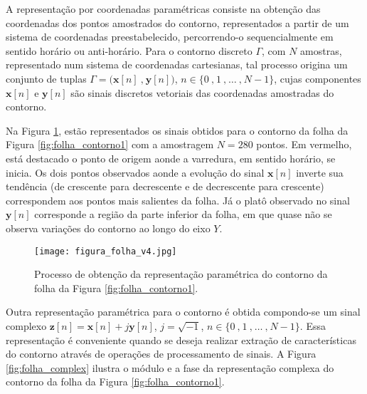 
A representação por coordenadas paramétricas consiste na obtenção das coordenadas dos pontos amostrados do contorno, representados a partir de um sistema de coordenadas preestabelecido, percorrendo-o sequencialmente em sentido horário ou anti-horário. Para o contorno discreto $\Gamma$, com $N$ amostras, representado num sistema de coordenadas cartesianas, tal processo origina um conjunto de tuplas $\Gamma = \big(\mathbf{x}[n]\:\text{,}\:\mathbf{y}[n]\big)$, $n \in {\{0\:\text{,}\:1\:\text{,}\:\dotsc\:\text{,}\:N-1\}}$, cujas componentes $\mathbf{x}[n]$ e $\mathbf{y}[n]$ são sinais discretos vetoriais das coordenadas amostradas do contorno.

Na Figura \ref{fig:folha_contorno}, estão representados os sinais obtidos para o contorno da folha da Figura \ref{fig:folha_contorno1} com a amostragem $N = 280$ pontos. Em vermelho, está destacado o ponto de origem aonde a varredura, em sentido horário, se inicia. Os dois pontos observados aonde a evolução do sinal $\mathbf{x}[n]$ inverte sua tendência (de crescente para decrescente e de decrescente para crescente) correspondem aos pontos mais salientes da folha. Já o platô observado no sinal $\mathbf{y}[n]$ corresponde a região da parte inferior da folha, em que quase não se observa variações do contorno ao longo do eixo $Y$.
   
\begin{figure} 
\caption{\label{fig:folha_contorno} Processo de obtenção da representação paramétrica do contorno da folha da Figura \ref{fig:folha_contorno1}.}
\texttt{[image: figura\_folha\_v4.jpg]}
\end{figure}

Outra representação paramétrica para o contorno é obtida compondo-se um sinal complexo $\mathbf{z}[n] = \mathbf{x}[n] + j\mathbf{y}[n]$, $j = \sqrt{-1}$, $n \in {\{0\:\text{,}\:1\:\text{,}\:\dotsc\:\text{,}\:N-1\}}$. Essa representação é conveniente quando se deseja realizar extração de características do contorno através de operações de processamento de sinais. A Figura \ref{fig:folha_complex} ilustra o módulo e a fase da representação complexa do contorno da folha da Figura \ref{fig:folha_contorno1}. 

